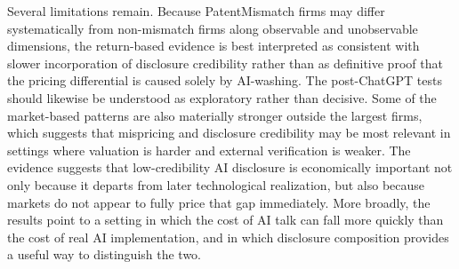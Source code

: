 Several limitations remain. Because PatentMismatch firms may differ systematically from non-mismatch firms along observable and unobservable dimensions, the return-based evidence is best interpreted as consistent with slower incorporation of disclosure credibility rather than as definitive proof that the pricing differential is caused solely by AI-washing. The post-ChatGPT tests should likewise be understood as exploratory rather than decisive. Some of the market-based patterns are also materially stronger outside the largest firms, which suggests that mispricing and disclosure credibility may be most relevant in settings where valuation is harder and external verification is weaker. The evidence suggests that low-credibility AI disclosure is economically important not only because it departs from later technological realization, but also because markets do not appear to fully price that gap immediately. More broadly, the results point to a setting in which the cost of AI talk can fall more quickly than the cost of real AI implementation, and in which disclosure composition provides a useful way to distinguish the two.